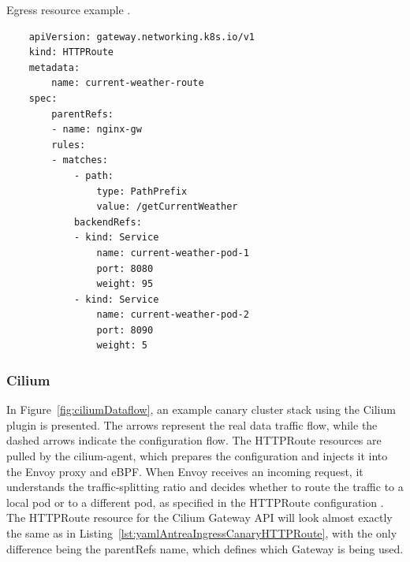 \begin{listing}[htb]
    \centering
    \caption{Egress resource example \cite{AntreaEgressArch}.}
    \begin{verbatim}
    apiVersion: gateway.networking.k8s.io/v1
    kind: HTTPRoute
    metadata:
        name: current-weather-route
    spec:
        parentRefs:
        - name: nginx-gw
        rules:
        - matches:
            - path:
                type: PathPrefix
                value: /getCurrentWeather
            backendRefs:
            - kind: Service
                name: current-weather-pod-1
                port: 8080
                weight: 95
            - kind: Service
                name: current-weather-pod-2
                port: 8090
                weight: 5
    \end{verbatim}
    \label{lst:yamlAntreaIngressCanaryHTTPRoute}
\end{listing}

\subsubsection{Cilium}
\label{subsection:ciliumIngress}

In Figure~\ref{fig:ciliumDataflow}, an example canary cluster stack using the Cilium plugin is presented. The arrows represent the real data traffic flow, while the dashed arrows indicate the configuration flow. The HTTPRoute resources are pulled by the cilium-agent, which prepares the configuration and injects it into the Envoy proxy and eBPF. When Envoy receives an incoming request, it understands the traffic-splitting ratio and decides whether to route the traffic to a local pod or to a different pod, as specified in the HTTPRoute configuration \cite{CiliumComponents}. The HTTPRoute resource for the Cilium Gateway API will look almost exactly the same as in Listing~\ref{lst:yamlAntreaIngressCanaryHTTPRoute}, with the only difference being the parentRefs name, which defines which Gateway is being used.

